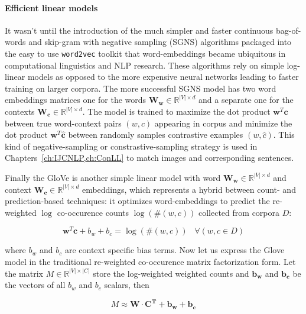 \paragraph{Efficient linear models}
It wasn't until the introduction of the much simpler and faster continuous bag-of-words
and skip-gram with negative sampling (SGNS) algorithms \cite{mikolov2013efficient}
packaged into the easy to use \texttt{word2vec} toolkit that
word-embeddings became ubiquitous in computational linguistics and NLP research.
These algorithms rely on simple log-linear models as opposed to the more expensive
neural networks leading to faster training on larger corpora. The more successful SGNS
model has two word embeddings matrices one for the words
$\mathbf{W_w}  \in \mathbb{R}^{|V| \times d}$
and a separate one for the contexts $\mathbf{W_c} \in \mathbb{R}^{|V| \times d}$.
The model is trained to maximize the dot product $\mathbf{w}^T\mathbf{c}$
between true word-context pairs $(w,c)$ appearing in corpus and minimize the
dot product $\mathbf{w}^T\mathbf{\hat{c}}$ between randomly
samples contrastive examples $(w,\hat{c})$. This kind of negative-sampling or
constrastive-sampling strategy is used in Chapters~\ref{ch:IJCNLP,ch:ConLL} to
match images and corresponding sentences.

Finally the GloVe \cite{pennington2014glove} is another simple linear model
with word $\mathbf{W_w}  \in \mathbb{R}^{|V| \times d}$ and context
$\mathbf{W_c} \in \mathbb{R}^{|V| \times d}$ embeddings, which
represents a hybrid between count- and prediction-based techniques:
it optimizes word-embeddings to predict the re-weighted
$\log$ co-occurence counts $\log(\#(w,c))$ collected from corpora $D$:

\begin{equation}
\label{eq:glove}
\mathbf{w}^T\mathbf{c} + b_w + b_c = \log(\#(w,c))\;\;\; \forall (w,c \in D)
\end{equation}

where $b_w$ and $b_c$ are context specific bias terms.
Now let us express the Glove model in the traditional re-weighted
co-occurence matrix factorization form.
Let the matrix $M \in \mathbb{R}^{|V| \times |C|}$ store the log-weighted
weighted counts and $\mathbf{b_w}$ and $\mathbf{b_c}$ be the vectors of all
$b_w$ and $b_c$ scalars, then

\begin{equation}
\label{eq:glove2}
M \approx \mathbf{W} \cdot \mathbf{C^T} + \mathbf{b_w} + \mathbf{b_c}
\end{equation}

